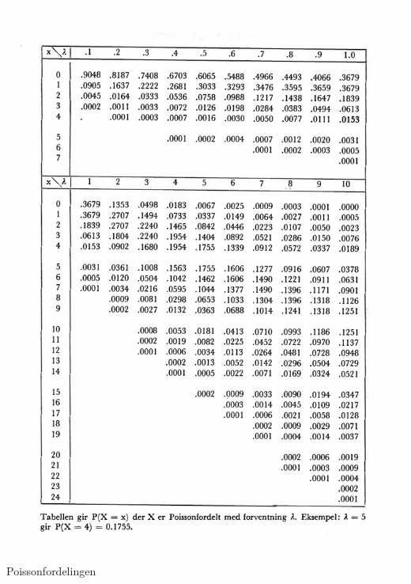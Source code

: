 \begin{table}[H]
\centering
  \includegraphics[scale=1.0]{figurer/Tabell_3_Poisson_fordeling.pdf}
 \caption{Poissonfordelingen}
 \label{tab:Poisson_fordeling} %
\end{table}

